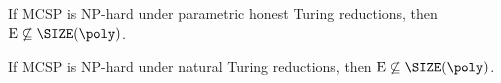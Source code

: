 \setcounter{nttheorem}{0}
\begin{nttheorem}
If MCSP is NP-hard under parametric honest Turing reductions, then $\mathrm E\not\subseteq\SIZE(\poly)$.
\end{nttheorem}
\begin{nttheorem}
If MCSP is NP-hard under natural Turing reductions, then $\mathrm E\not\subseteq\SIZE(\poly)$.
\end{nttheorem}
